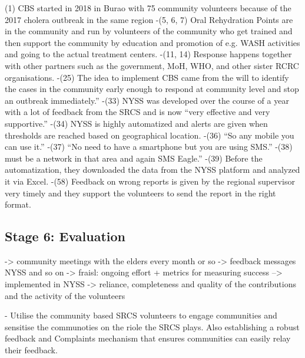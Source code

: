 
(1) CBS started in 2018 in Burao with 75 community volunteers because of the 2017 cholera outbreak in the same region
-(5, 6, 7) Oral Rehydration Points are in the community and run by volunteers of the community who get trained and then support the community by education and promotion of e.g. WASH activities and going to the actual treatment centers.
-(11, 14) Response happens together with other partners such as the government, MoH, WHO, and other sister RCRC organisations.
-(25) The idea to implement CBS came from the will to identify the cases in the community early enough to respond at community level and stop an outbreak immediately.”
-(33) NYSS was developed over the course of a year with a lot of feedback from the SRCS and is now “very effective and very supportive.”
-(34) NYSS is highly automatized and alerts are given when thresholds are reached based on geographical location.
-(36) “So any mobile you can use it.”
-(37) “No need to have a smartphone but you are using SMS.”
-(38) must be a network in that area and again SMS Eagle.”
-(39) Before the automatization, they downloaded the data from the NYSS platform and analyzed it via Excel.
-(58) Feedback on wrong reports is given by the regional supervisor very timely and they support the volunteers to send the report in the right format.






\subsection{Stage 6: Evaluation}
-> community meetings with the elders every month or so
-> feedback messages NYSS and so on
-> fraisl: ongoing effort + metrics for measuring success --> implemented in NYSS -> reliance, completeness and quality of the contributions and the activity of the volunteers








-	Utilise the community based SRCS volunteers to engage communities and sensitise the communoties on the riole the SRCS plays. Also establishing a robust feedback and Complaints mechanism that ensures communities can easily relay their feedback.





